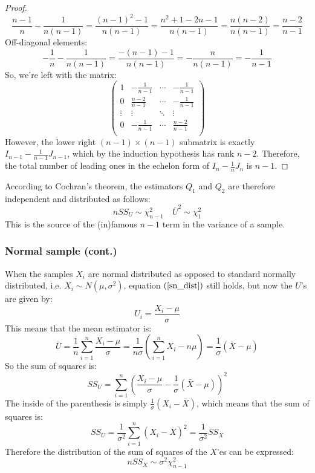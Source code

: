\documentclass[12pt, a4paper]{article}
\begin{document}
\begin{proof}
\begin{equation}
\frac{n-1}{n}-\frac{1}{n(n-1)}=\frac{(n-1)^2-1}{n(n-1)}=\frac{n^2+1-2n-1}{n(n-1)}=\frac{n(n-2)}{n(n-1)}=\frac{n-2}{n-1}
\end{equation}
Off-diagonal elements:
\begin{equation}
-\frac{1}{n}-\frac{1}{n(n-1)}=\frac{-(n-1)-1}{n(n-1)}=-\frac{n}{n(n-1)}=-\frac{1}{n-1}
\end{equation}
So, we're left with the matrix:
\begin{equation}
\begin{pmatrix}
	 1				& -\frac{1}{n-1}& \cdots	& -\frac{1}{n-1} \\
	 0				& \frac{n-2}{n-1}& \cdots	& -\frac{1}{n-1} \\
	 \vdots			& \vdots		& \ddots	& \vdots \\
	 0				& -\frac{1}{n-1}& \cdots	& \frac{n-2}{n-1} \\
\end{pmatrix}
\end{equation}
However, the lower right $(n-1)\times(n-1)$ submatrix is exactly $I_{n-1}-\frac{1}{n-1}J_{n-1}$, which by the induction hypothesis has rank $n-2$. Therefore, the total number of leading ones in the echelon form of $I_n-\frac{1}{n}J_n$ is $n-1$.
\end{proof}
According to Cochran's theorem, the estimators $Q_1$ and $Q_2$ are therefore independent and distributed as follows:
\begin{equation}
\label{sn_dist}
n SS_U\sim\chi^2_{n-1}\quad\bar{U}^2\sim\chi^2_1
\end{equation}
This is the source of the (in)famous $n-1$ term in the variance of a sample.

\subsubsection{Normal sample (cont.)}
When the samples $X_i$ are normal distributed as opposed to standard normally distributed, i.e. $X_i\sim N(\mu,\sigma^2)$, equation $(\ref{sn_dist})$ still holds, but now the $U$'s are given by:
\begin{equation}
U_i=\frac{X_i-\mu}{\sigma}
\end{equation}
This means that the mean estimator is:
\begin{equation}
\bar{U}=\frac{1}{n}\sum_{i=1}^n\frac{X_i-\mu}{\sigma}=\frac{1}{n\sigma}\left(\sum_{i=1}^n X_i -n\mu\right)=\frac{1}{\sigma}\left(\bar{X}-\mu\right)
\end{equation}
So the sum of squares is:
\begin{equation}
SS_U=\sum_{i=1}^n\left(\frac{X_i-\mu}{\sigma}-\frac{1}{\sigma}\left(\bar{X}-\mu\right)\right)^2
\end{equation}
The inside of the parenthesis is simply $\frac{1}{\sigma}(X_i-\bar{X})$, which means that the sum of squares is:
\begin{equation}
SS_U=\frac{1}{\sigma^2}\sum_{i=1}^n(X_i-\bar{X})^2=\frac{1}{\sigma^2}SS_X
\end{equation}
Therefore the distribution of the sum of squares of the $X$'es can be expressed:
\begin{equation}
n SS_X\sim\sigma^2\chi^2_{n-1}
\end{equation}
\end{document}

